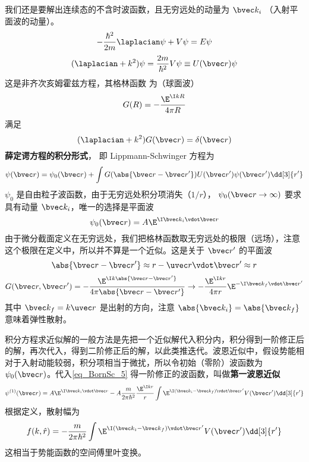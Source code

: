 

我们还是要解出连续态的不含时波函数，且无穷远处的动量为 $\bvec k_i$ （入射平面波的动量）。
\begin{equation}
-\frac{\hbar^2}{2m} \laplacian\psi  + V\psi  = E\psi
\end{equation}
\begin{equation}
(\laplacian + k^2)\psi  = \frac{2m}{\hbar^2} V\psi  \equiv U(\bvec r)\psi
\end{equation}
这是非齐次亥姆霍兹方程，其格林函数%
为（球面波）
\begin{equation}
G(R) =  -\frac{\E^{\I kR}}{4\pi R}
\end{equation}
满足
\begin{equation}
(\laplacian + k^2)G(\bvec r) = \delta(\bvec r)
\end{equation}
\textbf{薛定谔方程的积分形式}， 即 Lippmann-Schwinger 方程为
\begin{equation}\label{eq_BornSc_5}
\psi(\bvec r) = \psi_0(\bvec r) + \int G(\abs{\bvec r - \bvec r'})U(\bvec r')\psi (\bvec r') \dd[3]{r'}
\end{equation}
$\psi_0$ 是自由粒子波函数，由于无穷远处积分项消失（$1/r$）， $\psi_0(\bvec r\to\infty)$ 要求具有动量 $\bvec k_i$，唯一的选择是平面波
\begin{equation}
\psi_0(\bvec r) = A\E^{\I\bvec k_i \vdot \bvec r}
\end{equation}
由于微分截面定义在无穷远处，我们把格林函数取无穷远处的极限（远场），注意这个极限在定义中，所以并不算是一个近似。这是关于 $\bvec r'$ 的平面波
\begin{equation}
\abs{\bvec r - \bvec r'} \approx r - \uvec r \vdot \bvec r' \approx r
\end{equation}
\begin{equation}
G(\bvec r, \bvec r') =  - \frac{\E^{\I k \abs{\bvec r - \bvec r'}}}{4\pi\abs{\bvec r - \bvec r'}} \to  - \frac{\E^{\I kr}}{4\pi r} \E^{-\I \bvec k_f \vdot \bvec r'}
\end{equation}
其中 $\bvec k_f = k\uvec r$ 是出射的方向，注意 $\abs{\bvec k_i} = \abs{\bvec k_f}$ 意味着弹性散射。

积分方程求近似解的一般方法是先把一个近似解代入积分内，积分得到一阶修正后的解，再次代入，得到二阶修正后的解，以此类推迭代。波恩近似中，假设势能相对于入射动能较弱，积分项相当于微扰，所以令初始（零阶）波函数为 $\psi_0(\bvec r)$。代入\autoref{eq_BornSc_5} 得一阶修正的波函数，叫做\textbf{第一波恩近似}
\begin{equation}
\psi ^{(1)}(\bvec r) = A\E^{\I\bvec k_i \vdot \bvec r} - A \frac{m}{2\pi\hbar^2} \frac{\E^{\I kr}}{r}\int \E^{\I (\bvec k_i - \bvec k_f) \vdot \bvec r'} V(\bvec r') \dd[3]{r'}
\end{equation}
根据定义，散射幅为
\begin{equation}
f(k, \hat r) =  - \frac{m}{2\pi\hbar^2} \int \E^{\I (\bvec k_i - \bvec k_f) \vdot \bvec r'} V(\bvec r') \dd[3]{r'}
\end{equation}
这相当于势能函数的空间傅里叶变换。

